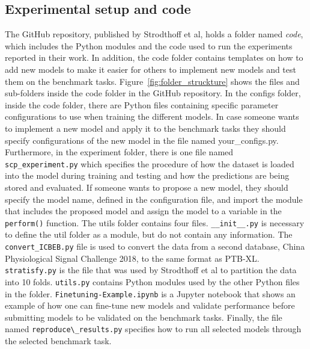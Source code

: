 \subsection{Experimental setup and code}
The GitHub repository, published by Strodthoff et al, holds a folder named \textit{code}, which includes the Python modules and the code used to run the experiments reported in their work. In addition, the code folder contains templates on how to add new models to make it easier for others to implement new models and test them on the benchmark tasks. Figure~\ref{fig:folder_struckture} shows the files and sub-folders inside the code folder in the GitHub repository. In the configs folder, inside the code folder, there are Python files containing specific parameter configurations to use when training the different models. In case someone wants to implement a new model and apply it to the benchmark tasks they should specify configurations of the new model in the file named your\_configs.py. Furthermore, in the experiment folder, there is one file named \\ \verb|scp_experiment.py| which specifies the procedure of how the dataset is loaded into the model during training and testing and how the predictions are being stored and evaluated. If someone wants to propose a new model, they should specify the model name, defined in the configuration file, and import the module that includes the proposed model and assign the model to a variable in the \verb|perform()| function. The utils folder contains four files. \verb|__init__.py| is necessary to define the util folder as a module, but do not contain any information. The \verb|convert_ICBEB.py| file is used to convert the data from a second database, China Physiological Signal Challenge 2018, to the same format as PTB-XL. \verb|stratisfy.py| is the file that was used by Strodthoff et al to partition the data into 10 folds. \verb|utils.py| contains Python modules used by the other Python files in the folder. \verb|Finetuning-Example.ipynb| is a Jupyter notebook that shows an example of how one can fine-tune new models and validate performance before submitting models to be validated on the benchmark tasks. Finally, the file named \verb|reproduce\_results.py| specifies how to run all selected models through the selected benchmark task.

